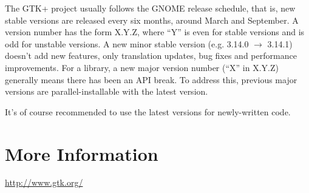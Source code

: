 \documentclass[a4paper,notumble]{leaflet}
\begin{document}
The GTK+ project usually follows the GNOME release schedule, that is, new stable versions are released every six months, around March and September. A version number has the form X.Y.Z, where ``Y'' is even for stable versions and is odd for unstable versions. A new minor stable version (e.g. 3.14.0 $\rightarrow$ 3.14.1) doesn't add new features, only translation updates, bug fixes and performance improvements. For a library, a new major version number (``X'' in X.Y.Z) generally means there has been an API break. To address this, previous major versions are parallel-installable with the latest version.

It's of course recommended to use the latest versions for newly-written code.

%

\section{More Information}

\url{http://www.gtk.org/}
\end{document}
